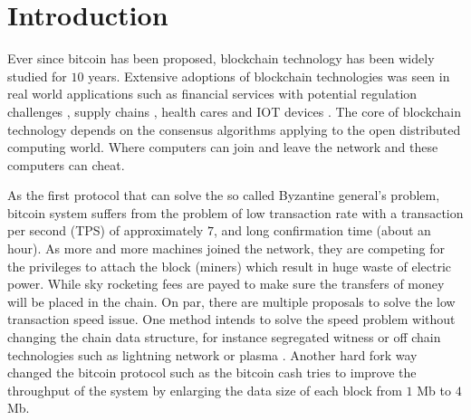 \section{Introduction}
Ever since bitcoin \cite{nakamoto2008bitcoin} has been proposed, blockchain technology has been widely studied for $10$ years. 
Extensive adoptions of blockchain technologies was seen in real world applications such as 
financial services with potential regulation challenges \cite{michael2018blockchain, tapscott2017blockchain}, 
supply chains \cite{korpela2017digital,tian2016agri, abeyratne2016blockchain}, 
health cares \cite{azaria2016medrec,yue2016healthcare} and IOT devices \cite{christidis2016blockchains}.
The core of blockchain technology depends on the consensus algorithms applying to the open distributed computing world.
Where computers can join and leave the network and these computers can cheat.

As the first protocol that can solve the so called Byzantine general's problem, 
bitcoin system suffers from the problem of low transaction rate with a transaction per second (TPS) of approximately $7$, and long confirmation time (about an hour).
As more and more machines joined the network, they are competing for the privileges to attach the block (miners) which result in huge waste of electric power.
While sky rocketing fees are payed to make sure the transfers of money will be placed in the chain.
On par, there are multiple proposals to solve the low transaction speed issue. 
One method intends to solve the speed problem without changing the chain data structure, for instance segregated witness \cite{lombrozo2015segregated} 
or off chain technologies such as lightning network \cite{poon2016bitcoin} or plasma \cite{poon2017plasma}. 
Another hard fork way changed the bitcoin protocol such as the bitcoin cash tries to improve the throughput of the system by enlarging the data size of each block from $1$ Mb to $4$ Mb. 

